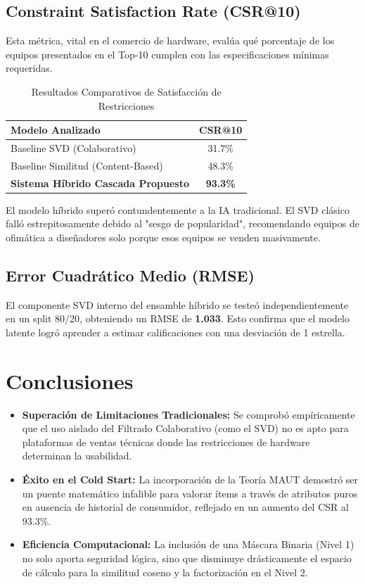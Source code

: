 \documentclass[12pt,a4paper]{report}
\begin{document}
\section{Constraint Satisfaction Rate (CSR@10)}
Esta métrica, vital en el comercio de hardware, evalúa qué porcentaje de los equipos presentados en el Top-10 cumplen con las especificaciones mínimas requeridas.
\begin{table}[H]
    \centering
    \begin{tabular}{lc}
        \toprule
        \textbf{Modelo Analizado} & \textbf{CSR@10} \\
        \midrule
        Baseline SVD (Colaborativo) & 31.7\% \\
        Baseline Similitud (Content-Based) & 48.3\% \\
        \textbf{Sistema Híbrido Cascada Propuesto} & \textbf{93.3\%} \\
        \bottomrule
    \end{tabular}
    \caption{Resultados Comparativos de Satisfacción de Restricciones}
\end{table}
El modelo híbrido superó contundentemente a la IA tradicional. El SVD clásico falló estrepitosamente debido al "sesgo de popularidad", recomendando equipos de ofimática a diseñadores solo porque esos equipos se venden masivamente.

\section{Error Cuadrático Medio (RMSE)}
El componente SVD interno del ensamble híbrido se testeó independientemente en un split 80/20, obteniendo un RMSE de \textbf{1.033}. Esto confirma que el modelo latente logró aprender a estimar calificaciones con una desviación de 1 estrella.

\chapter{Conclusiones}
\begin{itemize}
    \item \textbf{Superación de Limitaciones Tradicionales:} Se comprobó empíricamente que el uso aislado del Filtrado Colaborativo (como el SVD) no es apto para plataformas de ventas técnicas donde las restricciones de hardware determinan la usabilidad.
    \item \textbf{Éxito en el Cold Start:} La incorporación de la Teoría MAUT demostró ser un puente matemático infalible para valorar ítems a través de atributos puros en ausencia de historial de consumidor, reflejado en un aumento del CSR al 93.3\%.
    \item \textbf{Eficiencia Computacional:} La inclusión de una Máscara Binaria (Nivel 1) no solo aporta seguridad lógica, sino que disminuye drásticamente el espacio de cálculo para la similitud coseno y la factorización en el Nivel 2.
\end{itemize}
\end{document}
